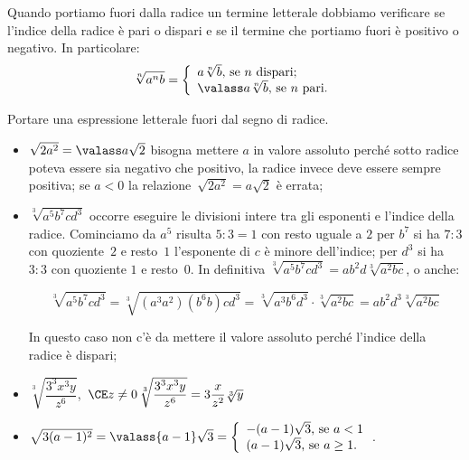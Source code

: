 Quando portiamo fuori dalla radice un termine letterale dobbiamo verificare 
se l'indice della radice è pari o dispari e se il termine che portiamo fuori 
è positivo o negativo. In particolare:
\[\sqrt[n]{a^nb}=\left\{\begin{array}{l}
 a\sqrt[n]b\text{, se }n\text{ dispari;}\\
 \valass a\sqrt[n]b\text{, se }n\text{ pari.}\end{array}\right.\]

\begin{exrig}
 \begin{esempio}
 Portare una espressione letterale fuori dal segno di radice.
\begin{itemize}
 \item $\sqrt{2a^2}=\valass a\sqrt 2$ bisogna mettere $a$ in valore assoluto 
 perché sotto radice poteva essere sia negativo che positivo, la radice invece 
 deve essere sempre positiva; se $a<0$ la relazione~$\sqrt{2a^2}=a\sqrt 2$ è 
 errata;
 \item $\sqrt[3]{a^5b^7cd^3}$ occorre eseguire le divisioni intere tra gli 
 esponenti e l'indice della radice. Cominciamo da $a^5$ risulta $5:3 = 1$ con 
 resto uguale a $2$ per $b^7$ si ha $7:3$ con quoziente~$2$ e resto~$1$ 
 l'esponente di $c$ è minore dell'indice; per $d^3$ si ha $3:3$ con quoziente 
 $1$ e resto~$0$. In definitiva 
 $\sqrt[3]{a^5b^7cd^3}={ab}^2 d\sqrt[3]{a^2{bc}}$, o anche:
 
\[\sqrt[3]{a^5b^7cd^3}=\sqrt[3]{(a^3a^2)(b^6b)cd^3}=
  \sqrt[3]{a^3b^6d^3}\cdot \sqrt[3]{a^2bc}=ab^2d^3\sqrt[3]{a^2bc}\]
  
In questo caso non c'è da mettere il valore assoluto perché l'indice della 
radice è dispari;
 \item $\sqrt[3]{\dfrac{3^3x^3y}{z^6}}$,\, 
       $\CE z\neq 0\,\sqrt[3]{\dfrac{3^3x^3y}{z^6}}=3\dfrac x{z^2}\sqrt[3]y$
 \item $\sqrt{3(a-1)^2}=\valass{a-1}\sqrt 3=\left\{\begin{array}{l}
   -(a-1)\sqrt 3\text{, se }a < 1 \\
   (a-1)\sqrt 3\text{, se }a \ge 1
 .\end{array}\right.$.
\end{itemize}
 \end{esempio}
\end{exrig}

